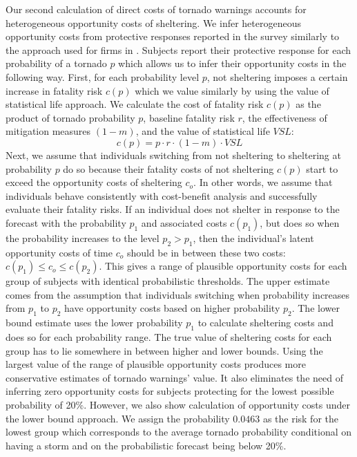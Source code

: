 \documentclass{ametsocV6.1}
\begin{document}
Our second calculation of direct costs of tornado warnings accounts for heterogeneous opportunity costs of sheltering. We infer heterogeneous opportunity costs from protective responses reported in the survey similarly to the approach used for firms in \citet{howard_firm_2021}. Subjects report their protective response for each probability of a tornado $p$ which allows us to infer their opportunity costs in the following way. First, for each probability level $p$, not sheltering imposes a certain increase in fatality risk $c(p)$ which we value similarly by using the value of statistical life approach. We calculate the cost of fatality risk $c(p)$ as the product of tornado probability $p$, baseline fatality risk $r$, the effectiveness of mitigation measures $(1-m)$, and the value of statistical life $VSL$:
$$c(p)=p \cdot r \cdot (1-m) \cdot VSL$$
Next, we assume that individuals switching from not sheltering to sheltering at probability $p$ do so because their fatality costs of not sheltering $c(p)$ start to exceed the opportunity costs of sheltering $c_o$. In other words, we assume that individuals behave consistently with cost-benefit analysis and successfully evaluate their fatality risks.  If an individual does not shelter in response to the forecast with the probability $p_1$ and associated costs $c(p_1)$, but does so when the probability increases to the level $p_2>p_1$, then the individual's latent opportunity costs of time $c_o$ should be in between these two costs:  $c(p_1)\leq c_o\leq c(p_2)$. This gives a range of plausible opportunity costs for each group of subjects with identical probabilistic thresholds. The upper estimate comes from the assumption that individuals switching when probability increases from $p_1$ to $p_2$ have opportunity costs based on higher probability $p_2$. The lower bound estimate uses the lower probability $p_1$ to calculate sheltering costs and does so for each probability range.  The true value of sheltering costs for each group has to lie somewhere in between higher and lower bounds. Using the largest value of the range of plausible opportunity costs produces more conservative estimates of tornado warnings' value. It also eliminates the need of inferring zero opportunity costs for subjects protecting for the lowest possible probability of 20\%. However, we also show calculation of opportunity costs  under the lower bound approach. We assign the probability $0.0463$ as the risk for the lowest group which corresponds to the average tornado probability conditional on having a storm and on the probabilistic forecast being below 20\%.
\end{document}
